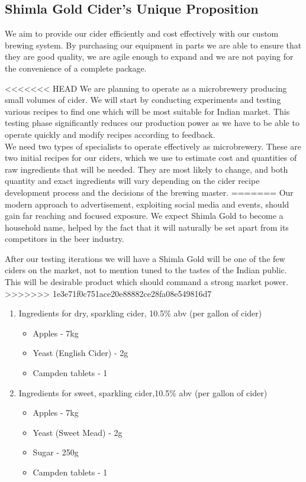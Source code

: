\documentclass[11pt]{article}
\begin{document}
\subsection{Shimla Gold Cider's Unique Proposition}

We aim to provide our cider efficiently and cost effectively with our custom
brewing system. By purchasing our equipment in parts we are able to ensure that
they are good quality, we are agile enough to expand and we are not paying for
the convenience of a complete package.

<<<<<<< HEAD
We are planning to operate as a microbrewery producing small volumes of cider. We will start by conducting experiments and testing various recipes to find one which will be most suitable for Indian market. This testing phase significantly reduces our production power as we have to be able to operate quickly and modify recipes according to feedback. \\

We need two types of specialists to operate effectively as microbrewery. These are two initial recipes for our ciders, which we use to estimate cost and quantities of raw ingredients that will be needed. They are most likely to change, and both quantity and exact ingredients will vary depending on the cider recipe development process and the decisions of the brewing master.
=======
Our modern approach to advertisement, exploiting social media and events, should 
gain far reaching and focused exposure. We expect Shimla Gold to become a
household name, helped by the fact that it will naturally be set apart from its
competitors in the beer industry. 

After our testing iterations we will 
have a Shimla Gold will be one of the few ciders on the market, not to mention 
tuned to the tastes of the Indian public. This will be desirable product which 
should command a strong market power.
>>>>>>> 1e3e71f0c751ace20e88882ce28fa08e549816d7

  \begin{enumerate}
    \item Ingredients for dry, sparkling cider, 10.5\% abv (per gallon of cider)
	  \begin{itemize}
	   \item Apples - 7kg
	   \item Yeast (English Cider) - 2g
	   \item Campden tablets - 1
       \end{itemize}
	\item Ingredients for sweet, sparkling cider,10.5\% abv (per gallon of cider)
	  \begin{itemize}
	  \item Apples - 7kg
	  \item Yeast (Sweet Mead) - 2g
	  \item Sugar - 250g
	  \item Campden tablets - 1
	  \end{itemize}
	\end{enumerate}
\end{document}
